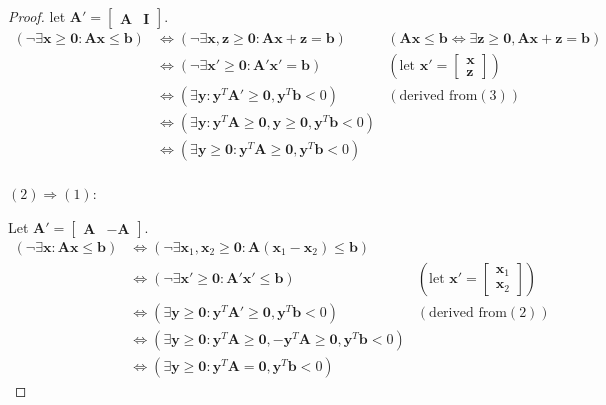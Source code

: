 \begin{proof}
        let $\mathbf{A}'=\left[
        \begin{matrix}
            \mathbf{A} & \mathbf{I}
        \end{matrix}
        \right]$.
        \begin{align*}
            (\neg \exists \mathbf{x}\ge \mathbf{0}: \mathbf{A}\mathbf{x}\le \mathbf{b})&\iff (\neg \exists \mathbf{x},\mathbf{z}\ge \mathbf{0}:\mathbf{A}\mathbf{x}+\mathbf{z}=\mathbf{b}) &(\mathbf{A}\mathbf{x}\le \mathbf{b} \iff \exists \mathbf{z}\ge \mathbf{0},\mathbf{A}\mathbf{x}+\mathbf{z}=\mathbf{b})\\
                                          &\iff (\neg \exists \mathbf{x}'\ge \mathbf{0}:\mathbf{A}'\mathbf{x}'=\mathbf{b})  &(\text{let }\mathbf{x}'=\left[ \begin{matrix} \mathbf{x} \\ \mathbf{z}\end{matrix} \right])\\
                                          &\iff (\exists \mathbf{y} :\mathbf{y}^{T}\mathbf{A}'\ge \mathbf{0},\mathbf{y}^{T}\mathbf{b}<0) &(\text{derived from} (3)) \\
                                          &\iff (\exists \mathbf{y} :\mathbf{y}^{T}\mathbf{A}\ge \mathbf{0},\mathbf{y}\ge \mathbf{0},\mathbf{y}^{T}\mathbf{b}<0) \\
                                          &\iff (\exists \mathbf{y}\ge \mathbf{0} :\mathbf{y}^{T}\mathbf{A}\ge \mathbf{0},\mathbf{y}^{T}\mathbf{b}<0) \\
        \end{align*}

        $(2)\Rightarrow(1)$:

        Let $\mathbf{A}'=\left[
        \begin{matrix}
            \mathbf{A} & -\mathbf{A}
        \end{matrix}
        \right]$.
        \begin{align*}
            (\neg \exists \mathbf{x}: \mathbf{A}\mathbf{x}\le \mathbf{b}) &\iff (\neg \exists \mathbf{x}_1,\mathbf{x}_2\ge \mathbf{0}: \mathbf{A}(\mathbf{x}_1-\mathbf{x}_2)\le \mathbf{b}) \\
            &\iff (\neg \exists \mathbf{x}'\ge \mathbf{0}: \mathbf{A}'\mathbf{x}'\le \mathbf{b}) &(\text{let }\mathbf{x}'=\left[ \begin{matrix}\mathbf{x}_1 \\\mathbf{x}_2  \end{matrix} \right])\\
            &\iff (\exists \mathbf{y}\ge \mathbf{0} :\mathbf{y}^{T}\mathbf{A}'\ge \mathbf{0},\mathbf{y}^{T}\mathbf{b}<0) &(\text{derived from} (2)) \\
            &\iff (\exists \mathbf{y}\ge \mathbf{0} :\mathbf{y}^{T}\mathbf{A}\ge \mathbf{0},-\mathbf{y}^{T}\mathbf{A}\ge \mathbf{0},\mathbf{y}^{T}\mathbf{b}<0) \\
            &\iff (\exists \mathbf{y}\ge \mathbf{0} :\mathbf{y}^{T}\mathbf{A}= \mathbf{0},\mathbf{y}^{T}\mathbf{b}<0)
        \end{align*}
    \end{proof}


